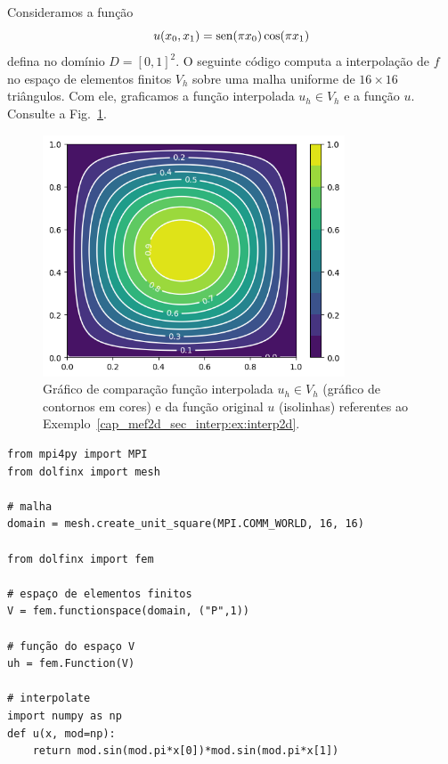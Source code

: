 \begin{ex}\label{cap_mef2d_sec_interp:ex:interp2d}
  Consideramos a função
  \begin{equation}
    u(x_0, x_1) = \operatorname{sen}(\pi x_0)\cos(\pi x_1)
  \end{equation}
  defina no domínio $D = [0,1]^2$. O seguinte código computa a interpolação de $f$ no espaço de elementos finitos $V_h$ sobre uma malha uniforme de $16\times 16$ triângulos. Com ele, graficamos a função interpolada $u_h\in V_h$ e a função $u$. Consulte a Fig.~\ref{cap_mef2d_sec_interp:fig:interp2d}.

  \begin{figure}
    \centering
    \includegraphics[width=0.8\textwidth]{cap_mef2d/dados/ex_interp/fig}
    \caption{Gráfico de comparação função interpolada $u_h\in V_h$ (gráfico de contornos em cores) e da função original $u$ (isolinhas) referentes ao Exemplo~\ref{cap_mef2d_sec_interp:ex:interp2d}.}
    \label{cap_mef2d_sec_interp:fig:interp2d}
  \end{figure}

\begin{lstlisting}[caption=interp2d.py, label=cap_mef2d_sec_interp:cod:interp2d]
from mpi4py import MPI
from dolfinx import mesh

# malha
domain = mesh.create_unit_square(MPI.COMM_WORLD, 16, 16)

from dolfinx import fem

# espaço de elementos finitos
V = fem.functionspace(domain, ("P",1))

# função do espaço V
uh = fem.Function(V)

# interpolate
import numpy as np
def u(x, mod=np):
    return mod.sin(mod.pi*x[0])*mod.sin(mod.pi*x[1])


\end{lstlisting}
\end{ex}
